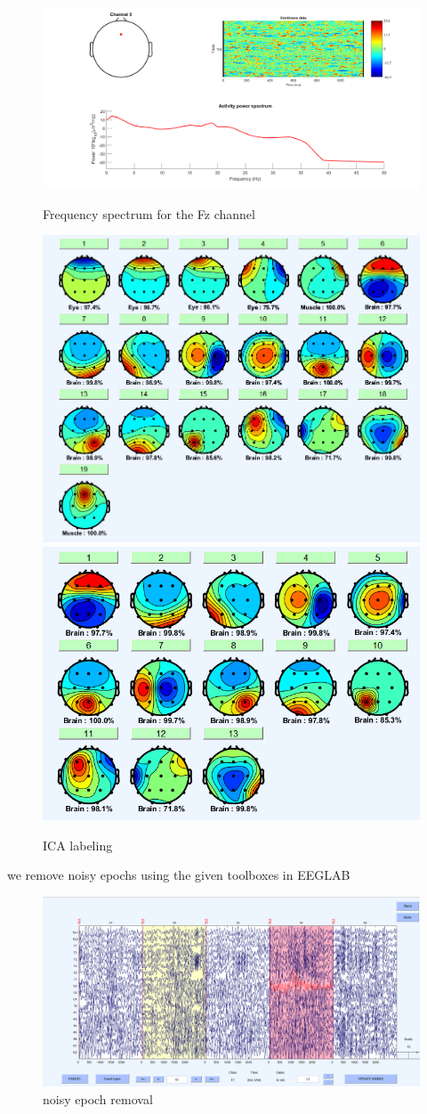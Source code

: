 \documentclass[12pt]{article}
\begin{document}
\begin{figure}[h]
	\centering
	\includegraphics*[width=\linewidth]{../computation/preprocessing/snapshots/power_spectrum_Fz.png}
	\caption{Frequency spectrum for the Fz channel}
	\includegraphics*[width=0.49\linewidth]{../computation/preprocessing/snapshots/ICA_Labels.png}
	\includegraphics*[width=0.49\linewidth]{../computation/preprocessing/snapshots/ICA_brain_only.png}
	\caption{ICA labeling}
\end{figure}

\vfil
\begin{qsolve}[]
	we remove noisy epochs using the given toolboxes in EEGLAB
\end{qsolve}

\begin{figure}[h]
	\includegraphics*[width=\linewidth]{../computation/preprocessing/snapshots/noisy_epoch.png}
	\caption{noisy epoch removal}
\end{figure}
\end{document}

